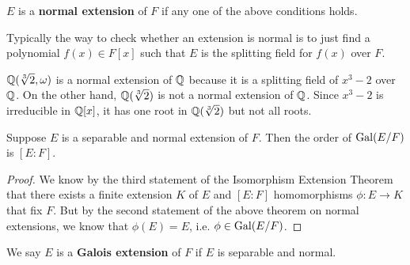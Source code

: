 \documentclass{../mathnotes}
\begin{document}
\begin{defn}
    $E$ is a \textbf{normal extension} of $F$ if any one of the above conditions holds.
\end{defn}

Typically the way to check whether an extension is normal is to just find a polynomial $f(x)\in F[x]$ such that $E$ is the
splitting field for $f(x)$ over $F$.

\begin{exmp}
    $\mathbb{Q}(\sqrt[3]{2},\omega)$ is a normal extension of $\mathbb{Q}$ because it is a splitting field of $x^3-2$ over $\mathbb{Q}$.
    On the other hand, $\mathbb{Q}(\sqrt[3]{2})$ is not a normal extension of $\mathbb{Q}$. Since $x^3-2$ is irreducible in $\mathbb{Q}[x]$,
    it has one root in $\mathbb{Q}(\sqrt[3]{2})$ but not all roots.
\end{exmp}

\begin{cor}
    Suppose $E$ is a separable and normal extension of $F$. Then the order of $\operatorname{Gal}(E/F)$ is $[E:F]$.
\end{cor}
\begin{proof}
    We know by the third statement of the Isomorphism Extension Theorem that there exists a finite extension $K$ of $E$
    and $[E:F]$ homomorphisms $\phi:E\to K$ that fix $F$. But by the second statement of the above theorem on normal extensions,
    we know that $\phi(E)=E$, i.e. $\phi\in\operatorname{Gal}(E/F)$.
\end{proof}

\begin{defn}
    We say $E$ is a \textbf{Galois extension} of $F$ if $E$ is separable and normal.
\end{defn}
\end{document}
